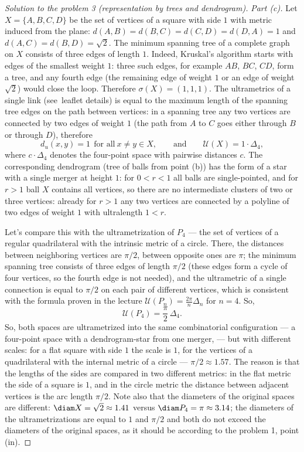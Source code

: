\documentclass[a4paper,12pt]{report}
\begin{document}
\begin{proof}[Solution to the problem \textup{3} \textup{(}representation by trees and dendrogram\textup{)}]
\textit{Part \textup{(c)}.} Let $X=\{A,B,C,D\}$ be the set of vertices of a square with side $1$ with metric induced from the plane\textup{:} $d(A,B)=d(B,C)=d(C,D)=d(D,A)=1$ and $d(A,C)=d(B,D)=\sqrt2$. The minimum spanning tree of a complete graph on $X$ consists of three edges of length $1$. Indeed, Kruskal's algorithm starts with edges of the smallest weight $1$\textup{:} three such edges, for example $AB$, $BC$, $CD$, form a tree, and any fourth edge \textup{(}the remaining edge of weight $1$ or an edge of weight $\sqrt2$\textup{)} would close the loop. Therefore $\sigma(X)=(1,1,1)$. The ultrametrics of a single link \textup{(}see\ leaflet details\textup{)} is equal to the maximum length of the spanning tree edges on the path between vertices\textup{:} in a spanning tree any two vertices are connected by two edges of weight $1$ \textup{(}the path from $A$ to $C$ goes either through $B$ or through $D$\textup{)}, therefore
\[
d_u(x,y)=1\ \ \text{for all}\ x\ne y\in X,\qquad\text{and}\qquad \mathcal U(X)=1\cdot\Delta_4 ,
\]
where $c\cdot\Delta_4$ denotes the four-point space with pairwise distances $c$. The corresponding dendrogram \textup{(}tree of balls from point \textup{(b)}\textup{)} has the form of a star with a single merger at height $1$\textup{:} for $0<r<1$ all balls are single-pointed, and for $r>1$ ball $X$ contains all vertices, so there are no intermediate clusters of two or three vertices\textup{:} already for $r>1$ any two vertices are connected by a polyline of two edges of weight $1$ with ultralength $1<r$.

Let's compare this with the ultrametrization of $P_4$ --- the set of vertices of a regular quadrilateral with the intrinsic metric of a circle. There, the distances between neighboring vertices are $\pi/2$, between opposite ones are $\pi$\textup{;} the minimum spanning tree consists of three edges of length $\pi/2$ \textup{(}these edges form a cycle of four vertices, so the fourth edge is not needed\textup{)}, and the ultrametric of a single connection is equal to $\pi/2$ on each pair of different vertices, which is consistent with the formula proven in the lecture $\mathcal U(P_n)=\frac{2\pi}{n}\Delta_n$ for $n=4$. So,
\[
\mathcal U(P_4)=\frac{\pi}{2}\,\Delta_4 .
\]
So, both spaces are ultrametrized into the same combinatorial configuration --- a four-point space with a dendrogram-star from one merger, --- but with different scales\textup{:} for a flat square with side $1$ the scale is $1$, for the vertices of a quadrilateral with the internal metric of a circle --- $\pi/2\approx1.57$. The reason is that the lengths of the sides are compared in two different metrics\textup{:} in the flat metric the side of a square is $1$, and in the circle metric the distance between adjacent vertices is the arc length $\pi/2$. Note also that the diameters of the original spaces are different\textup{:} $\diam X=\sqrt2\approx1.41$ versus $\diam P_4=\pi\approx3.14$\textup{;} the diameters of the ultrametrizations are equal to $1$ and $\pi/2$ and both do not exceed the diameters of the original spaces, as it should be according to the problem \textup{1}, point \textup{(in)}.

\end{proof}
\end{document}
